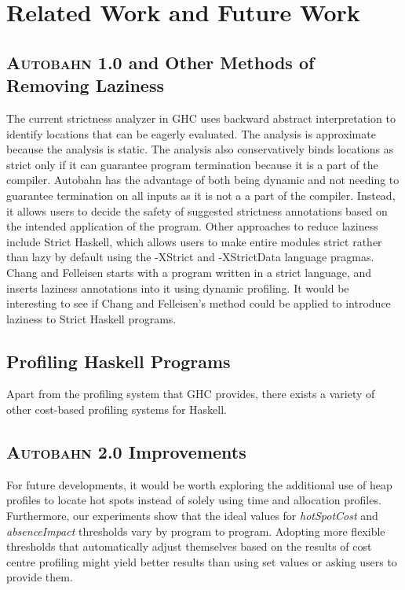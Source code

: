 \documentclass[format=sigplan, review=true]{acmart}
\newcommand{\hotspotcost}[0]{\textit{hotSpotCost}}
\newcommand{\Ao}[0]{\textsc{Autobahn 1.0}}
\newcommand{\At}[0]{\textsc{Autobahn 2.0}}
\newcommand{\absim}[0]{\textit{absenceImpact}}
\begin{document}
\section{Related Work and Future Work}

\subsection{\Ao{} and Other Methods of Removing Laziness}

The current strictness analyzer in GHC uses backward abstract interpretation to identify locations that can be eagerly evaluated. The analysis is approximate because the analysis is static. The analysis also conservatively binds locations as strict only if it can guarantee program termination because it is a part of the compiler. Autobahn has the advantage of both being dynamic and not needing to guarantee termination on all inputs as it is not a a part of the compiler. Instead, it allows users to decide the safety of suggested strictness annotations based on the intended application of the program. Other approaches to reduce laziness include Strict Haskell, which allows users to make entire modules strict rather than lazy by default using the -XStrict and -XStrictData language pragmas. Chang and Felleisen starts with a program written in a strict language, and inserts laziness annotations into it using dynamic profiling. It would be interesting to see if Chang and Felleisen's method could be applied to introduce laziness to Strict Haskell programs.


\subsection{Profiling Haskell Programs}
Apart from the profiling system that GHC provides, there exists a variety of other cost-based profiling systems for Haskell. 



\subsection{\At{} Improvements}
For future developments, it would be worth exploring the additional use of heap profiles to locate hot spots instead of solely using time and allocation profiles. Furthermore, our experiments show that the ideal values for \hotspotcost{} and \absim{} thresholds vary by program to program. Adopting more flexible thresholds that automatically adjust themselves based on the results of cost centre profiling might yield better results than using set values or asking users to provide them.
\end{document}
